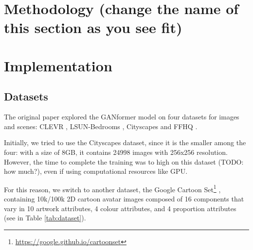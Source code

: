 \documentclass{article}
\begin{document}
	\section{Methodology (change the name of this section as you see fit)}
	
	
	\section{Implementation}
%	
%	
%	
%	
	\subsection{Datasets}
	
	The original paper \cite{hudson2021generative} explored the GANformer model on four datasets for 
	images and scenes: CLEVR \cite{johnson2017clevr}, LSUN-Bedrooms \cite{yu2015lsun}, Cityscapes 
	\cite{cordts2016cityscapes} and FFHQ \cite{karras2019style}. 
	
	Initially, we tried to use the Cityscapes dataset, since it is the smaller among the four: with a size of 
	8GB, it contains 24998 images with 256x256 resolution. 
	However, the time to complete the training was to high on this dataset (TODO: how much?), even if 
	using computational resources like GPU.
	
	For this reason, we switch to another dataset, the Google Cartoon Set\footnote{	
	\url{https://google.github.io/cartoonset}} \cite{cartoonset}, containing 10k/100k 2D cartoon avatar 
	images composed of 16 components that vary in 10 artwork attributes, 4 colour attributes, and 4 
	proportion attributes (see in Table \ref{tab:dataset}). 
\end{document}
